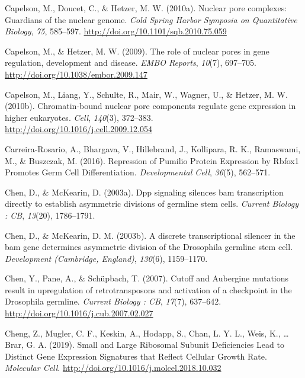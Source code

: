 \documentclass[12pt,oneside]{reedthesis}
\begin{document}
\leavevmode\hypertarget{ref-capelsonNuclearPoreComplexes2010}{}%
Capelson, M., Doucet, C., \& Hetzer, M. W. (2010a). Nuclear pore complexes: Guardians of the nuclear genome. \emph{Cold Spring Harbor Symposia on Quantitative Biology}, \emph{75}, 585--597. \url{http://doi.org/10.1101/sqb.2010.75.059}

\leavevmode\hypertarget{ref-capelsonRoleNuclearPores2009}{}%
Capelson, M., \& Hetzer, M. W. (2009). The role of nuclear pores in gene regulation, development and disease. \emph{EMBO Reports}, \emph{10}(7), 697--705. \url{http://doi.org/10.1038/embor.2009.147}

\leavevmode\hypertarget{ref-capelsonChromatinboundNuclearPore2010}{}%
Capelson, M., Liang, Y., Schulte, R., Mair, W., Wagner, U., \& Hetzer, M. W. (2010b). Chromatin-bound nuclear pore components regulate gene expression in higher eukaryotes. \emph{Cell}, \emph{140}(3), 372--383. \url{http://doi.org/10.1016/j.cell.2009.12.054}

\leavevmode\hypertarget{ref-carreira-rosarioRepressionPumilioProtein2016}{}%
Carreira-Rosario, A., Bhargava, V., Hillebrand, J., Kollipara, R. K., Ramaswami, M., \& Buszczak, M. (2016). Repression of Pumilio Protein Expression by Rbfox1 Promotes Germ Cell Differentiation. \emph{Developmental Cell}, \emph{36}(5), 562--571.

\leavevmode\hypertarget{ref-chenDppSignalingSilences2003}{}%
Chen, D., \& McKearin, D. (2003a). Dpp signaling silences bam transcription directly to establish asymmetric divisions of germline stem cells. \emph{Current Biology : CB}, \emph{13}(20), 1786--1791.

\leavevmode\hypertarget{ref-chenDiscreteTranscriptionalSilencer2003}{}%
Chen, D., \& McKearin, D. M. (2003b). A discrete transcriptional silencer in the bam gene determines asymmetric division of the Drosophila germline stem cell. \emph{Development (Cambridge, England)}, \emph{130}(6), 1159--1170.

\leavevmode\hypertarget{ref-chenCutoffAubergineMutations2007}{}%
Chen, Y., Pane, A., \& Schüpbach, T. (2007). Cutoff and Aubergine mutations result in upregulation of retrotransposons and activation of a checkpoint in the Drosophila germline. \emph{Current Biology : CB}, \emph{17}(7), 637--642. \url{http://doi.org/10.1016/j.cub.2007.02.027}

\leavevmode\hypertarget{ref-chengSmallLargeRibosomal2019}{}%
Cheng, Z., Mugler, C. F., Keskin, A., Hodapp, S., Chan, L. Y. L., Weis, K., \ldots{} Brar, G. A. (2019). Small and Large Ribosomal Subunit Deficiencies Lead to Distinct Gene Expression Signatures that Reflect Cellular Growth Rate. \emph{Molecular Cell}. \url{http://doi.org/10.1016/j.molcel.2018.10.032}
\end{document}
